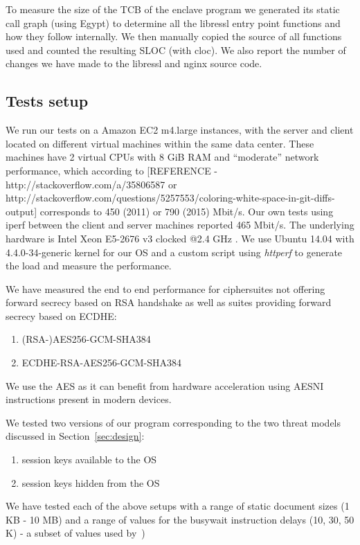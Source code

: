 \documentclass[../main.tex]{subfiles}
\begin{document}
To measure the size of the TCB of the enclave program we generated its static
call graph (using Egypt) to determine all the libressl entry point functions
and how they follow internally. We then manually copied the source of all
functions used and counted the resulting SLOC (with cloc). We also report the
number of changes we have made to the libressl and nginx source code.

\subsection{Tests setup}
We run our tests on a Amazon EC2 m4.large instances, with the server and
client located on different virtual machines within the same data center.
These machines have 2 virtual CPUs with 8 GiB RAM and ``moderate'' network
performance, which according to [REFERENCE - http://stackoverflow.com/a/35806587  or  http://stackoverflow.com/questions/5257553/coloring-white-space-in-git-diffs-output] corresponds to 450 (2011) or 790 (2015) Mbit/s. Our
own tests using iperf between the client and server machines reported
465 Mbit/s. The underlying hardware is Intel Xeon E5-2676 v3 clocked @2.4 GHz
\cite{aws_instances}. We use Ubuntu 14.04 with 4.4.0-34-generic kernel for our
OS and a custom script using \textit{httperf} to generate the load and measure
the performance.

We have measured the end to end performance for ciphersuites not offering
forward secrecy based on RSA handshake as well as suites providing forward
secrecy based on ECDHE:
\begin{enumerate}
  \item (RSA-)AES256-GCM-SHA384
  \item ECDHE-RSA-AES256-GCM-SHA384
\end{enumerate}

We use the AES as it can benefit from hardware acceleration using AESNI
instructions present in modern devices.

We tested two versions of our program corresponding to the two threat models
discussed in Section~\ref{sec:design}:
\begin{enumerate}
  \item session keys available to the OS
  \item session keys hidden from the OS
\end{enumerate}

We have tested each of the above setups with a range of static document sizes
(1 KB - 10 MB) and a range of values for the busywait instruction delays (10,
30, 50 K) - a subset of values used by~\cite{Baumann14})
\end{document}
